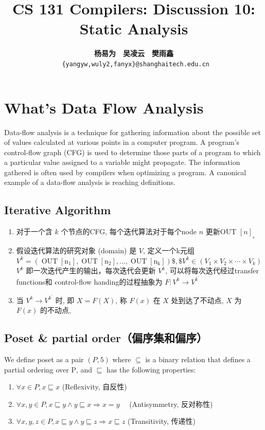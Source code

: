 \documentclass[a4paper]{article}
\title{CS 131 Compilers: Discussion 10: Static Analysis}
\author{\textbf{杨易为}~~\textbf{吴凌云}~~\textbf{樊雨鑫} \\ \texttt{ \{yangyw,wuly2,fanyx\}@shanghaitech.edu.cn}}
\theoremstyle{definition}
\begin{document}
\maketitle
\section{What's Data Flow Analysis}
Data-flow analysis is a technique for gathering information about the possible set of values calculated at various points in a computer program. A program's control-flow graph (CFG) is used to determine those parts of a program to which a particular value assigned to a variable might propagate. The information gathered is often used by compilers when optimizing a program. A canonical example of a data-flow analysis is reaching definitions.
\subsection{Iterative Algorithm}
\begin{enumerate}
  \item 对于一个含 $k$ 个节点的CFG, 每个迭代算法对于每个node $n$ 更新OUT $[n]_{\text {。 }}$
  \item 假设迭代算法的研究对象 (domain) 是 $V$, 定义一个k元组
  $V^{k}=\left(\operatorname{OUT}\left[\mathrm{n}_{1}\right], \operatorname{OUT}\left[\mathrm{n}_{2}\right], \ldots, \operatorname{OUT}\left[\mathrm{n}_{\mathrm{k}}\right]\right) \$, \$ V^{k} \in\left(V_{1} \times V_{2} \times \cdots \times V_{k}\right)$
  $V^{k}$ 即一次迭代产生的输出，每次迭代会更新 $V^{k}$, 可以将每次迭代经过transfer functions和 control-flow handing的过程抽象为 $F: V^{k} \rightarrow V^{k^{\prime}}$
  \item 当 $V^{k} \rightarrow V^{k^{\prime}}$ 时,
  即 $X=F(X)$, 称 $F(x)$ 在 $X$ 处到达了不动点, $X$ 为 $F(x)$ 的不动点,
\end{enumerate}

\subsection{Poset \& partial order（偏序集和偏序）}
We define poset as a pair $(P, 5)$ where $\subseteq$ is a binary relation that defines a partial ordering
over $\mathrm{P}$, and $\sqsubseteq$ has the following properties:
\begin{enumerate}
 \item $\forall x \in P, x \sqsubseteq x$ (Reflexivity, 自反性)
 \item $\forall x, y \in P, x \sqsubseteq y \wedge y \sqsubseteq x \Rightarrow x=y \quad$ (Antisymmetry, 反对称性)
 \item $\forall x, y, z \in P, x \sqsubseteq y \wedge y \sqsubseteq z \Rightarrow x \sqsubseteq z$ (Transitivity, 传递性)
\end{enumerate}
\end{document}
